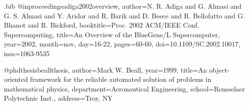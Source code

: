 \RequirePackage{filecontents}
\begin{filecontents*}{\jobname.bib}
@inproceedings{adiga2002overview,
  author={N. R. Adiga and G. Almasi and G. S. Almasi and Y. Aridor 
    and R. Barik and D. Beece and R. Bellofatto and G. Bhanot 
    and R. Bickford},
  booktitle={Proc. 2002 ACM/IEEE Conf. Supercomputing},
  title={{An Overview of the BlueGene/L Supercomputer}},
  year={2002},
  month=nov,
  day={16-22},
  pages={60-60},
  doi={10.1109/SC.2002.10017},
  issn={1063-9535}
}

@phdthesis{beallthesis,
  author={Mark W. Beall},
  year={1999},
  title={An object-oriented framework for the reliable automated solution of problems in mathematical physics},
  department={Aeronautical Engineering},
  school={Rensselaer Polytechnic Inst.},
  address={Troy, NY}
}

\end{filecontents*}

\documentclass[12pt]{thesis}
\usepackage[utf8]{inputenc}



Here is a citation~\cite{adiga2002overview}.
Here is a citation~\cite{beallthesis}.




